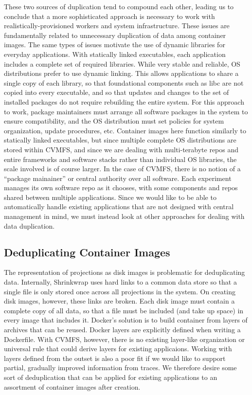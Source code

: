 \documentclass[conference]{IEEEtran}
\begin{document}
These two sources of duplication tend to compound each other,
leading us to conclude that a more sophisticated approach is necessary to work with realistically-provisioned workers and system infrastructure.
These issues are fundamentally related to unnecessary duplication of data among container images.
The same types of issues motivate the use of dynamic libraries for everyday applications.
With statically linked executables,
each application includes a complete set of required libraries.
While very stable and reliable,
OS distributions prefer to use dynamic linking.
This allows applications to share a single copy of each library,
so that foundational components such as libc are not copied into every executable,
and so that updates and changes to the set of installed packages do not require rebuilding the entire system.
For this approach to work,
package maintainers must arrange all software packages in the system to ensure compatibility,
and the OS distribution must set policies for system organization, update procedures, etc.
Container images here function similarly to statically linked executables,
but since multiple complete OS distributions are stored within CVMFS,
and since we are dealing with multi-terabyte repos and entire frameworks and software stacks rather than individual OS libraries,
the scale involved is of course larger.
In the case of CVMFS, there is no notion of a ``package mainainer'' or central authority over all software.
Each experiment manages its own software repo as it chooses,
with some components and repos shared between multiple applications.
Since we would like to be able to automatically handle existing applications that are not designed with central management in mind,
we must instead look at other approaches for dealing with data duplication.

\subsection{Deduplicating Container Images}

The representation of projections as disk images is problematic for deduplicating data.
Internally, Shrinkwrap uses hard links to a common data store so that a single file is only stored once across all projections in the system.
On creating disk images, however,
these links are broken.
Each disk image must contain a complete copy of all data,
so that a file must be included (and take up space) in every image that includes it.
Docker's solution is to build container from layers of archives that can be reused.
Docker layers are explicitly defined when writing a Dockerfile.
With CVMFS, however, there is no existing layer-like organization or universal rule that could derive layers for existing applicaions.
Working with layers defined from the outset is also a poor fit if we would like to support partial, gradually improved information from traces.
We therefore desire some sort of deduplication that can be applied for existing applications to an assortment of container images after creation.
\end{document}

